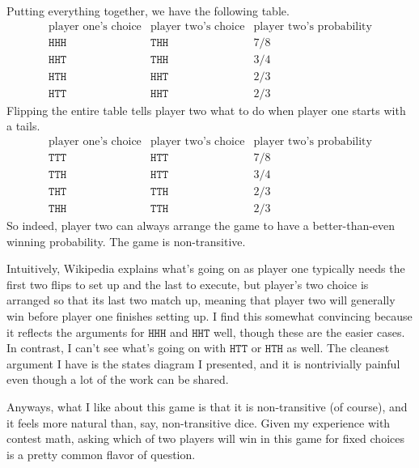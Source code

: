 Putting everything together, we have the following table.
\[\begin{array}{c|c|c}
    \text{player one's choice} & \text{player two's choice} & \text{player two's probability} \\\hline
    \texttt{HHH} & \texttt{THH} & 7/8 \\
    \texttt{HHT} & \texttt{THH} & 3/4 \\
    \texttt{HTH} & \texttt{HHT} & 2/3 \\
    \texttt{HTT} & \texttt{HHT} & 2/3
\end{array}\]
Flipping the entire table tells player two what to do when player one starts with a tails.
\[\begin{array}{c|c|c}
    \text{player one's choice} & \text{player two's choice} & \text{player two's probability} \\\hline
    \texttt{TTT} & \texttt{HTT} & 7/8 \\
    \texttt{TTH} & \texttt{HTT} & 3/4 \\
    \texttt{THT} & \texttt{TTH} & 2/3 \\
    \texttt{THH} & \texttt{TTH} & 2/3
\end{array}\]
So indeed, player two can always arrange the game to have a better-than-even winning probability. The game is non-transitive.

Intuitively, Wikipedia explains what's going on as player one typically needs the first two flips to set up and the last to execute, but player's two choice is arranged so that its last two match up, meaning that player two will generally win before player one finishes setting up. 
I find this somewhat convincing because it reflects the arguments for $\texttt{HHH}$ and $\texttt{HHT}$ well, though these are the easier cases. In contrast, I can't see what's going on with $\texttt{HTT}$ or $\texttt{HTH}$ as well. The cleanest argument I have is the states diagram I presented, and it is nontrivially painful even though a lot of the work can be shared.

Anyways, what I like about this game is that it is non-transitive (of course), and it feels more natural than, say, non-transitive dice. Given my experience with contest math, asking which of two players will win in this game for fixed choices is a pretty common flavor of question.

